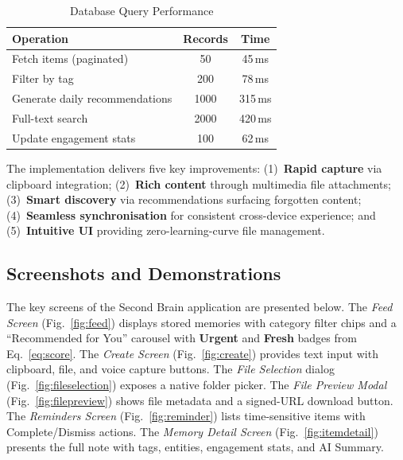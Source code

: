\documentclass[10pt,twocolumn,a4paper]{article}
\begin{document}
\begin{table}[h]
\centering
\caption{Database Query Performance}
\label{tab:db_perf}
\small
\begin{tabular}{|l|c|c|}
\hline
\textbf{Operation}           & \textbf{Records} & \textbf{Time} \\
\hline
Fetch items (paginated)      & 50               & 45\,ms \\
Filter by tag                & 200              & 78\,ms \\
Generate daily recommendations & 1000            & 315\,ms \\
Full-text search             & 2000             & 420\,ms \\
Update engagement stats      & 100              & 62\,ms \\
\hline
\end{tabular}


The implementation delivers five key improvements: (1)~\textbf{Rapid capture} via clipboard
integration; (2)~\textbf{Rich content} through multimedia file attachments; (3)~\textbf{Smart
discovery} via recommendations surfacing forgotten content; (4)~\textbf{Seamless
synchronisation} for consistent cross-device experience; and (5)~\textbf{Intuitive UI}
providing zero-learning-curve file management.

\subsection{Screenshots and Demonstrations}

The key screens of the Second Brain application are presented below.
The \textit{Feed Screen} (Fig.~\ref{fig:feed}) displays stored memories with category
filter chips and a ``Recommended for You'' carousel with \textbf{Urgent} and \textbf{Fresh}
badges from Eq.~\ref{eq:score}. The \textit{Create Screen} (Fig.~\ref{fig:create}) provides
text input with clipboard, file, and voice capture buttons. The \textit{File Selection}
dialog (Fig.~\ref{fig:fileselection}) exposes a native folder picker. The \textit{File
Preview Modal} (Fig.~\ref{fig:filepreview}) shows file metadata and a signed-URL download
button. The \textit{Reminders Screen} (Fig.~\ref{fig:reminder}) lists time-sensitive items
with Complete/Dismiss actions. The \textit{Memory Detail Screen} (Fig.~\ref{fig:itemdetail})
presents the full note with tags, entities, engagement stats, and AI Summary.


\end{table}
\end{document}
